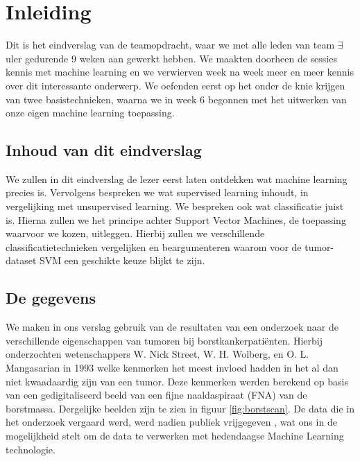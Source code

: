 \documentclass[TeamE-eindrapport]{subfiles}
\begin{document}
	
\chapter*{Inleiding}

	Dit is het eindverslag van de teamopdracht, waar we met alle leden van team \(\exists\)uler gedurende 9 weken aan gewerkt hebben. We maakten doorheen de sessies kennis met machine learning en we verwierven week na week meer en meer kennis over dit interessante onderwerp. We oefenden eerst op het onder de knie krijgen van twee basistechnieken, waarna we in week 6 begonnen met het uitwerken van onze eigen machine learning toepassing.
	
	\section*{Inhoud van dit eindverslag}

	We zullen in dit eindverslag de lezer eerst laten ontdekken wat machine learning precies is. Vervolgens bespreken we wat supervised learning inhoudt, in vergelijking met unsupervised learning. We bespreken ook wat classificatie juist is. Hierna zullen we het principe achter Support Vector Machines, de toepassing waarvoor we kozen, uitleggen. Hierbij zullen we verschillende classificatietechnieken vergelijken en beargumenteren waarom voor de tumor-dataset SVM een geschikte keuze blijkt te zijn.
	
	\section*{De gegevens}
	
	We maken in ons verslag gebruik van de resultaten van een onderzoek naar de verschillende eigenschappen van tumoren bij borstkankerpatiënten. Hierbij onderzochten wetenschappers W. Nick Street, W. H. Wolberg, en O. L. Mangasarian \cite{tumoronderzoek} in 1993 welke kenmerken het meest invloed hadden in het al dan niet kwaadaardig zijn van een tumor. Deze kenmerken werden berekend op basis van een gedigitaliseerd beeld van een fijne naaldaspiraat (FNA) van de borstmassa. Dergelijke beelden zijn te zien in figuur \ref{fig:borstscan}. De data die in het onderzoek vergaard werd, werd nadien publiek vrijgegeven \cite{tumordataset}, wat ons in de mogelijkheid stelt om de data te verwerken met hedendaagse Machine Learning technologie.
	
\end{document}
